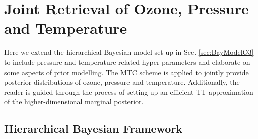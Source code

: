 \chapter{Joint Retrieval of Ozone, Pressure and Temperature}
\label{ch:FullBay}
\thispagestyle{empty}
Here we extend the hierarchical Bayesian model set up in Sec. \ref{sec:BayModelO3} to include pressure and temperature related hyper-parameters and elaborate on some aspects of prior modelling.
The MTC scheme is applied to jointly provide posterior distributions of ozone, pressure and temperature.
Additionally, the reader is guided through the process of setting up an efficient TT approximation of the higher-dimensional marginal posterior.



\section{Hierarchical Bayesian Framework}
\label{sec:FullHierarch}
